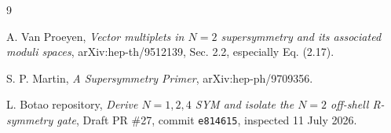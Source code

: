 \documentclass[11pt,a4paper,UTF8]{ctexart}
\numberwithin{equation}{section}
\begin{document}
\begin{thebibliography}{9}

A. Van Proeyen,
\emph{Vector multiplets in $N=2$ supersymmetry and its associated moduli spaces},
arXiv:hep-th/9512139, Sec. 2.2, especially Eq. (2.17).

S. P. Martin,
\emph{A Supersymmetry Primer},
arXiv:hep-ph/9709356.

L. Botao repository,
\emph{Derive $N=1,2,4$ SYM and isolate the $N=2$ off-shell R-symmetry gate},
Draft PR \#27, commit \texttt{e814615}, inspected 11 July 2026.

\end{thebibliography}
\end{document}

